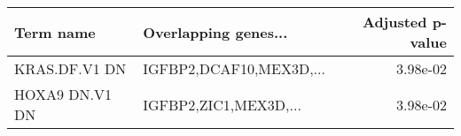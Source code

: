 \begin{tabular}{llr}
\toprule
     Term name &    Overlapping genes... &  Adjusted p-value \\
\midrule
 KRAS.DF.V1 DN & IGFBP2,DCAF10,MEX3D,... &          3.98e-02 \\
HOXA9 DN.V1 DN &   IGFBP2,ZIC1,MEX3D,... &          3.98e-02 \\
\bottomrule
\end{tabular}

